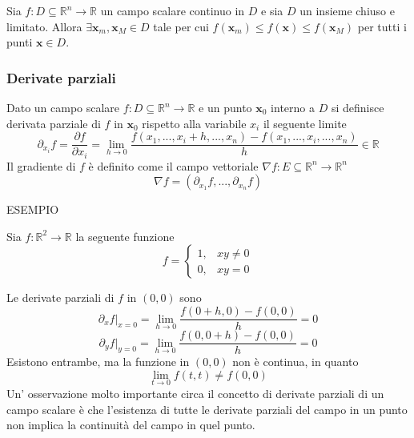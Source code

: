             \begin{theorem} 
                Sia $f: D \subseteq \mathbb{R}^{n} \rightarrow \mathbb{R}$ un campo scalare continuo in $D$ e sia $D$ un insieme chiuso e limitato. Allora $\exists \mathbf{x}_m, \mathbf{x}_M \in D$ tale per cui $f(\mathbf{x}_m) \leq f(\mathbf{x}) \leq f(\mathbf{x}_M)$ per tutti i punti $\mathbf{x} \in D$.
            \end{theorem}

            \subsubsection{Derivate parziali}
            Dato un campo scalare $f: D \subseteq \mathbb{R}^{n} \rightarrow \mathbb{R}$ e un punto $\mathbf{x}_0$ interno a $D$ si definisce derivata parziale di $f$ in $\mathbf{x}_0$ rispetto alla variabile $x_i$ il seguente limite
            \[
                \partial_{x_i} f = \frac{\partial f}{\partial x_i} = \lim_{h \rightarrow 0} \frac{f(x_1, ..., x_i + h, ..., x_n) - f(x_1, ..., x_i, ..., x_n)}{h} \in \mathbb{R}
            \]
            Il gradiente di $f$ è definito come il campo vettoriale $\nabla f: E \subseteq \mathbb{R}^{n} \rightarrow \mathbb{R}^{n}$
            \[
                \nabla f = (\partial_{x_1} f, ..., \partial_{x_n} f)
            \]

            ESEMPIO

            Sia $f: \mathbb{R}^2 \rightarrow \mathbb{R}$ la seguente funzione
            \[
                f = \begin{cases} 1, & xy \neq 0 \\ 0, & xy = 0 \end{cases}
            \]

            Le derivate parziali di $f$ in $(0, 0)$ sono
            \[
                \partial_{x} f |_{x = 0} = \lim_{h \rightarrow 0} \frac{f(0 + h, 0) - f(0, 0)}{h} = 0
            \]
            \[
                \partial_{y} f |_{y = 0} = \lim_{h \rightarrow 0} \frac{f(0, 0 + h) - f(0, 0)}{h} = 0
            \]
            Esistono entrambe, ma la funzione in $(0, 0)$ non è continua, in quanto
            \[
                \lim_{t \rightarrow 0} f(t, t) \neq f(0, 0)
            \]
            Un' osservazione molto importante circa il concetto di derivate parziali di un campo scalare è che
            l'esistenza di tutte le derivate parziali del campo in un punto non implica la continuità del campo in quel punto.

